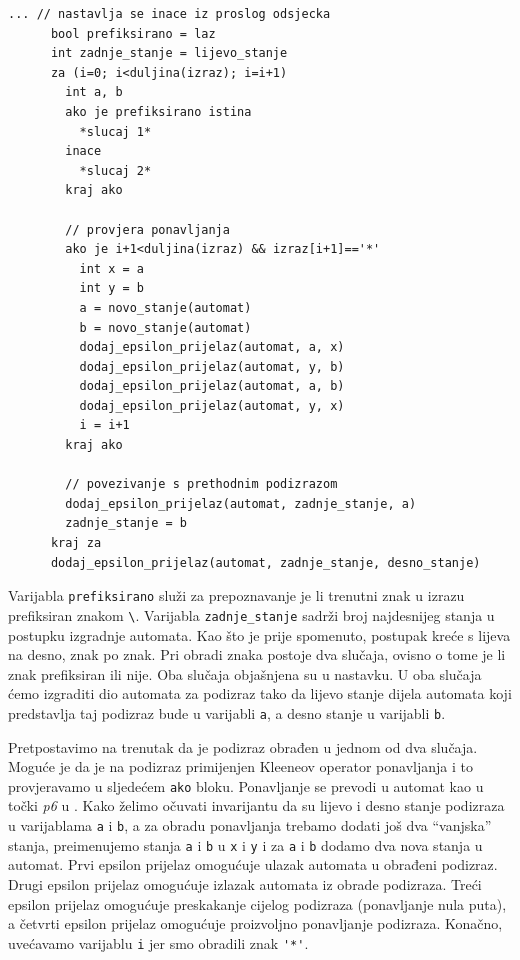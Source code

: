 \documentclass[times, 12pt, utf8]{book}
\begin{document}
\begin{lstlisting}[caption={Obrada nadovezivanja u funkciji \texttt{pretvori}.},label=lst:regex_pseudo_pretvori_3]
      ... // nastavlja se inace iz proslog odsjecka
      bool prefiksirano = laz
      int zadnje_stanje = lijevo_stanje
      za (i=0; i<duljina(izraz); i=i+1)
        int a, b
        ako je prefiksirano istina
          *slucaj 1*
        inace
          *slucaj 2*
        kraj ako

        // provjera ponavljanja
        ako je i+1<duljina(izraz) && izraz[i+1]=='*'
          int x = a
          int y = b
          a = novo_stanje(automat)
          b = novo_stanje(automat)
          dodaj_epsilon_prijelaz(automat, a, x)
          dodaj_epsilon_prijelaz(automat, y, b)
          dodaj_epsilon_prijelaz(automat, a, b)
          dodaj_epsilon_prijelaz(automat, y, x)
          i = i+1
        kraj ako

        // povezivanje s prethodnim podizrazom
        dodaj_epsilon_prijelaz(automat, zadnje_stanje, a)
        zadnje_stanje = b
      kraj za
      dodaj_epsilon_prijelaz(automat, zadnje_stanje, desno_stanje)
\end{lstlisting}

Varijabla \verb|prefiksirano| služi za prepoznavanje je li trenutni znak u izrazu prefiksiran znakom \verb|\|.
Varijabla \verb|zadnje_stanje| sadrži broj najdesnijeg stanja u postupku izgradnje automata.
Kao što je prije spomenuto, postupak kreće s lijeva na desno, znak po znak.
Pri obradi znaka postoje dva slučaja, ovisno o tome je li znak prefiksiran ili nije.
Oba slučaja objašnjena su u nastavku.
U oba slučaja ćemo izgraditi dio automata za podizraz tako da lijevo stanje dijela automata koji predstavlja taj podizraz bude u varijabli \verb|a|, a desno stanje u varijabli \verb|b|.

Pretpostavimo na trenutak da je podizraz obrađen u jednom od dva slučaja.
Moguće je da je na podizraz primijenjen Kleeneov operator ponavljanja i to provjeravamo u sljedećem \verb|ako| bloku.
Ponavljanje se prevodi u automat kao u točki \emph{p6} u \cite[poglavlje 2.2.2]{utr}.
Kako želimo očuvati invarijantu da su lijevo i desno stanje podizraza u varijablama \verb|a| i \verb|b|, a za obradu ponavljanja trebamo dodati još dva ``vanjska'' stanja, preimenujemo stanja \verb|a| i \verb|b| u \verb|x| i \verb|y| i za \verb|a| i \verb|b| dodamo dva nova stanja u automat.
Prvi epsilon prijelaz omogućuje ulazak automata u obrađeni podizraz.
Drugi epsilon prijelaz omogućuje izlazak automata iz obrade podizraza.
Treći epsilon prijelaz omogućuje preskakanje cijelog podizraza (ponavljanje nula puta), a četvrti epsilon prijelaz omogućuje proizvoljno ponavljanje podizraza.
Konačno, uvećavamo varijablu \verb|i| jer smo obradili znak \verb|'*'|.
\end{document}
